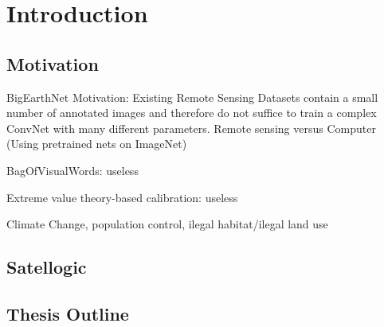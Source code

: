 
\chapter{Introduction}

\label{Chapter1}


\section{Motivation}

BigEarthNet Motivation:
Existing Remote Sensing Datasets contain a small number of annotated images and therefore do not suffice to train a complex ConvNet with many different parameters.
Remote sensing versus Computer (Using pretrained nets on ImageNet)


BagOfVisualWords: useless



Extreme value theory-based calibration: useless




Climate Change, population control, ilegal habitat/ilegal land use

\section{Satellogic}


\section{Thesis Outline}